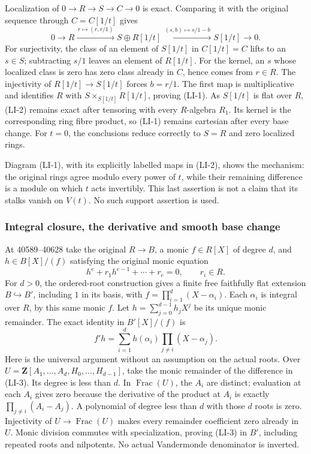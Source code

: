 Localization of \(0\to R\to S\to C\to0\) is exact. Comparing it with the original sequence through \(C=C[1/t]\) gives \[
0\longrightarrow R
\xrightarrow{\,r\mapsto(r,r/1)\,} S\oplus R[1/t]
\xrightarrow{\,(s,b)\mapsto s/1-b\,}S[1/t]
\longrightarrow0.
\tag{LI-2}
\] For surjectivity, the class of an element of \(S[1/t]\) in \(C[1/t]=C\) lifts to an \(s\in S\); subtracting \(s/1\) leaves an element of \(R[1/t]\). For the kernel, an \(s\) whose localized class is zero has zero class already in \(C\), hence comes from \(r\in R\). The injectivity of \(R[1/t]\to S[1/t]\) forces \(b=r/1\). The first map is multiplicative and identifies \(R\) with \(S\times_{S[1/t]}R[1/t]\), proving (LI-1). As \(S[1/t]\) is flat over \(R\), (LI-2) remains exact after tensoring with every \(R\)-algebra \(R_1\). Its kernel is the corresponding ring fibre product, so (LI-1) remains cartesian after every base change. For \(t=0\), the conclusions reduce correctly to \(S=R\) and zero localized rings.

Diagram (LI-1), with its explicitly labelled maps in (LI-2), shows the mechanism: the original rings agree modulo every power of \(t\), while their remaining difference is a module on which \(t\) acts invertibly. This last assertion is not a claim that its stalks vanish on \(V(t)\). No such support assertion is used.

\subsubsection{Integral closure, the derivative and smooth base change}\label{algebra-proof-054-integral-closure-the-derivative-and-smooth-base-change}

At 40589--40628 take the original \(R\to B\), a monic \(f\in R[X]\) of degree \(d\), and \(h\in B[X]/(f)\) satisfying the original monic equation \[
h^e+r_1h^{e-1}+\cdots+r_e=0,\qquad r_i\in R.
\] For \(d>0\), the ordered-root construction gives a finite free faithfully flat extension \(B\hookrightarrow B'\), including \(1\) in its basis, with \(f=\prod_{i=1}^d(X-\alpha_i)\). Each \(\alpha_i\) is integral over \(R\), by this same monic \(f\). Let \(h=\sum_{j=0}^{d-1}h_jX^j\) be its unique monic remainder. The exact identity in \(B'[X]/(f)\) is \[
f'h=\sum_{i=1}^d h(\alpha_i)\prod_{j\ne i}(X-\alpha_j).
\tag{LI-3}
\] Here is the universal argument without an assumption on the actual roots. Over \(U=\mathbf Z[A_1,\ldots,A_d,H_0,\ldots,H_{d-1}]\), take the monic remainder of the difference in (LI-3). Its degree is less than \(d\). In \(\operatorname{Frac}(U)\), the \(A_i\) are distinct; evaluation at each \(A_i\) gives zero because the derivative of the product at \(A_i\) is exactly \(\prod_{j\ne i}(A_i-A_j)\). A polynomial of degree less than \(d\) with those \(d\) roots is zero. Injectivity of \(U\to\operatorname{Frac}(U)\) makes every remainder coefficient zero already in \(U\). Monic division commutes with specialization, proving (LI-3) in \(B'\), including repeated roots and nilpotents. No actual Vandermonde denominator is inverted.

